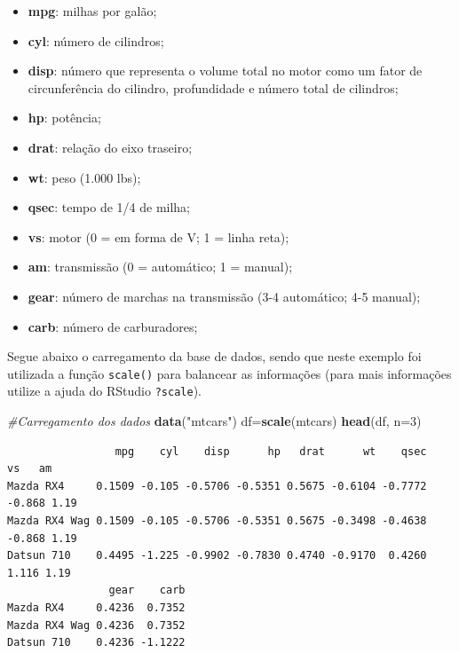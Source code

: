 \documentclass[12pt,brazil,oneside]{book}
\newenvironment{Shaded}{\begin{snugshade}}{\end{snugshade}}
\newcommand{\CommentTok}[1]{\textcolor[rgb]{0.56,0.35,0.01}{\textit{#1}}}
\newcommand{\DataTypeTok}[1]{\textcolor[rgb]{0.13,0.29,0.53}{#1}}
\newcommand{\DecValTok}[1]{\textcolor[rgb]{0.00,0.00,0.81}{#1}}
\newcommand{\KeywordTok}[1]{\textcolor[rgb]{0.13,0.29,0.53}{\textbf{#1}}}
\newcommand{\NormalTok}[1]{#1}
\newcommand{\StringTok}[1]{\textcolor[rgb]{0.31,0.60,0.02}{#1}}
\providecommand{\tightlist}{%
  \setlength{\itemsep}{0pt}\setlength{\parskip}{0pt}}
\begin{document}
\begin{itemize}
\tightlist
\item
  \textbf{mpg}: milhas por galão;
\item
  \textbf{cyl}: número de cilindros;
\item
  \textbf{disp}: número que representa o volume total no motor como um fator de circunferência do cilindro, profundidade e número total de cilindros;
\item
  \textbf{hp}: potência;
\item
  \textbf{drat}: relação do eixo traseiro;
\item
  \textbf{wt}: peso (1.000 lbs);
\item
  \textbf{qsec}: tempo de 1/4 de milha;
\item
  \textbf{vs}: motor (0 = em forma de V; 1 = linha reta);
\item
  \textbf{am}: transmissão (0 = automático; 1 = manual);
\item
  \textbf{gear}: número de marchas na transmissão (3-4 automático; 4-5 manual);
\item
  \textbf{carb}: número de carburadores;
\end{itemize}

Segue abaixo o carregamento da base de dados, sendo que neste exemplo foi utilizada a função \texttt{scale()} para balancear as informações (para mais informações utilize a ajuda do RStudio \texttt{?scale}).

\begin{Shaded}
\begin{Highlighting}[]
\CommentTok{#Carregamento dos dados}
\KeywordTok{data}\NormalTok{(}\StringTok{"mtcars"}\NormalTok{)}
\NormalTok{df=}\KeywordTok{scale}\NormalTok{(mtcars)}
\KeywordTok{head}\NormalTok{(df, }\DataTypeTok{n=}\DecValTok{3}\NormalTok{)}
\end{Highlighting}
\end{Shaded}

\begin{verbatim}
                 mpg    cyl    disp      hp   drat      wt    qsec     vs   am
Mazda RX4     0.1509 -0.105 -0.5706 -0.5351 0.5675 -0.6104 -0.7772 -0.868 1.19
Mazda RX4 Wag 0.1509 -0.105 -0.5706 -0.5351 0.5675 -0.3498 -0.4638 -0.868 1.19
Datsun 710    0.4495 -1.225 -0.9902 -0.7830 0.4740 -0.9170  0.4260  1.116 1.19
                gear    carb
Mazda RX4     0.4236  0.7352
Mazda RX4 Wag 0.4236  0.7352
Datsun 710    0.4236 -1.1222
\end{verbatim}
\end{document}
